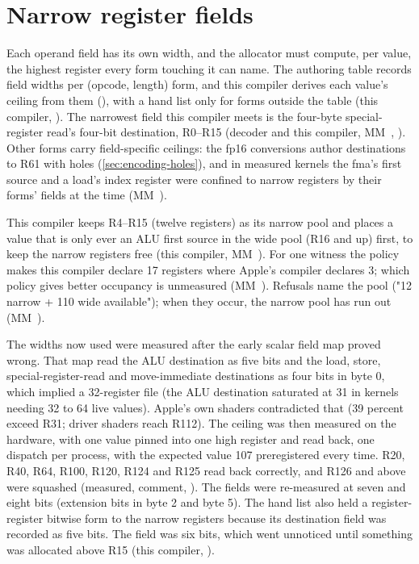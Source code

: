 \section{Narrow register fields}\label{sec:narrow-fields-narrow}

Each operand field has its own width, and the allocator must compute, per value, the highest register
every form touching it can name. The authoring table records field widths per (opcode, length) form, and this
compiler derives each value's ceiling from them (), with a hand list only for forms outside the table
(this compiler,  ). The narrowest field this compiler meets is the four-byte special-register
read's four-bit destination, R0–R15 (decoder and this compiler, MM~, ). Other forms carry
field-specific ceilings: the fp16 conversions author destinations to R61 with holes (\cref{sec:encoding-holes}), and in measured
kernels the fma's first source and a load's index register were confined to narrow registers by their forms' fields at
the time (MM~).

This compiler keeps R4–R15 (twelve registers) as its narrow pool and places a value that is only
ever an ALU first source in the wide pool (R16 and up) first, to keep the narrow registers free (this compiler,
MM~). For one witness the policy makes this compiler declare 17 registers where Apple's compiler
declares 3; which policy gives better occupancy is unmeasured (MM~). Refusals name the pool ("12 narrow + 110
wide available"); when they occur, the narrow pool has run out (MM~).

The widths now used were measured after the early scalar field map proved wrong. That map read the ALU
destination as five bits and the load, store, special-register-read and move-immediate destinations as four bits in
byte 0, which implied a 32-register file (the ALU destination saturated at 31 in kernels needing 32 to 64 live values).
Apple's own shaders contradicted that (39 percent exceed R31; driver shaders reach R112). The ceiling was then measured on
the hardware, with one value pinned into one high register and read back, one dispatch per process, with the expected value 107
preregistered every time. R20, R40, R64, R100, R120, R124 and R125 read back correctly, and R126 and above were squashed (measured,  comment,
). The fields were re-measured at seven and eight bits (extension bits in byte 2 and byte 5).
The hand list also held a register-register bitwise form to the narrow registers because its destination field was
recorded as five bits. The field was six bits, which went unnoticed until something
was allocated above R15 (this compiler, ).

